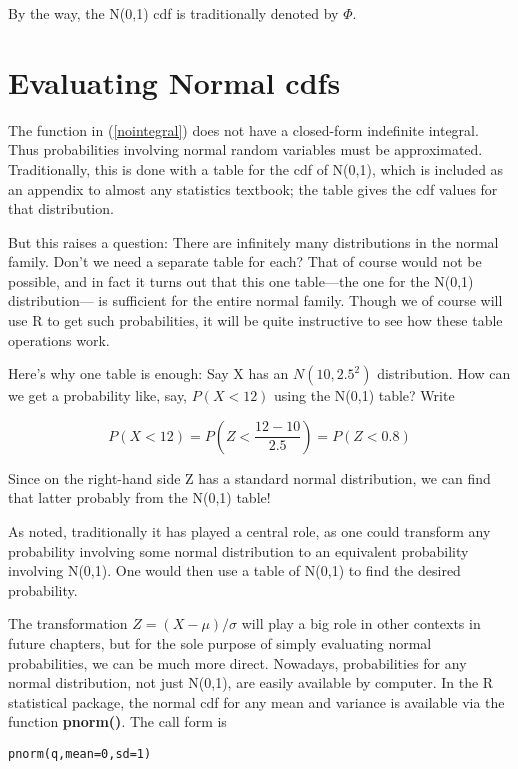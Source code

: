 By the way, the N(0,1) cdf is traditionally denoted by $\Phi$.  

\section{Evaluating Normal cdfs}

The function in (\ref{nointegral}) does not have a closed-form
indefinite integral.  Thus probabilities involving normal random
variables must be approximated.  Traditionally, this is done with a
table for the cdf of N(0,1), which is included as an appendix to almost
any statistics textbook; the table gives the cdf values for that
distribution.

But this raises a question:  There are infinitely many distributions in
the normal family.  Don't we need a separate table for each?  That of
course would not be possible, and in fact it turns out that this one
table---the one for the N(0,1) distribution--- is sufficient for the
entire normal family.  Though we of course will use R to get such
probabilities, it will be quite instructive to see how these table
operations work.

Here's why one table is enough: Say X has an $N(10,2.5^2)$ distribution.
How can we get a probability like, say, $P(X < 12)$ using the N(0,1)
table?  Write

\begin{equation}
P(X < 12) = P\left (Z < \frac{12-10}{2.5}\right ) = P(Z < 0.8)
\end{equation}

Since on the right-hand side Z has a standard normal distribution,
we can find that latter probably from the N(0,1) table!



As noted, traditionally it has played a central role, as one could
transform any probability involving some normal distribution to an
equivalent probability involving N(0,1).  One would then use a table of
N(0,1) to find the desired probability.

The transformation $Z = (X - \mu)/\sigma$ will play a big role in other
contexts in future chapters, but for the sole purpose of simply
evaluating normal probabilities, we can be much more direct.  Nowadays,
probabilities for any normal distribution, not just N(0,1), are easily
available by computer.  In the R statistical package, the normal cdf for
any mean and variance is available via the function {\bf pnorm()}.  The
call form is

\begin{Verbatim}[fontsize=\relsize{-2}]
pnorm(q,mean=0,sd=1)
\end{Verbatim}

